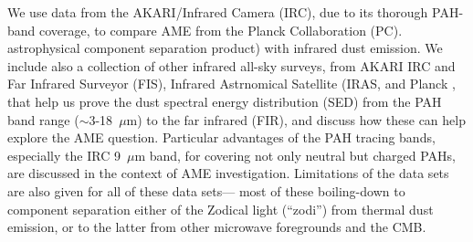 \documentclass[12pt,a4paper]{article}
\begin{document}
 We use data from the AKARI/Infrared Camera (IRC), due to its thorough PAH-band coverage, to compare AME from the Planck Collaboration (PC). astrophysical component separation product) with infrared dust emission. We include also a collection of other infrared all-sky surveys, from AKARI IRC and Far Infrared Surveyor (FIS), Infrared Astrnomical Satellite (IRAS,  and Planck , that help us prove the dust spectral energy distribution (SED) from the PAH band range ($\sim$3-18~$\mu$m) to the far infrared (FIR), and discuss how these can help explore the AME question. Particular advantages of the PAH tracing bands, especially the IRC 9~$\mu$m band, for covering not only neutral but charged PAHs, are discussed in the context of AME investigation. Limitations of the data sets are also given for all of these data sets--- most of these boiling-down to component separation either of the Zodical light (``zodi'') from thermal dust emission, or to the latter from other microwave foregrounds and the CMB.
\end{document}
